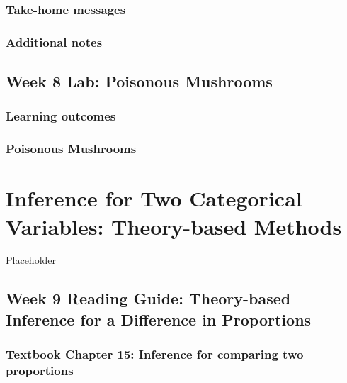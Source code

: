 \documentclass[
]{report}
\begin{document}
\hypertarget{take-home-messages-14}{%
\subsection{Take-home messages}\label{take-home-messages-14}}

\hypertarget{additional-notes-13}{%
\subsection{Additional notes}\label{additional-notes-13}}

\hypertarget{week-8-lab-poisonous-mushrooms}{%
\section{Week 8 Lab: Poisonous Mushrooms}\label{week-8-lab-poisonous-mushrooms}}

\hypertarget{learning-outcomes-16}{%
\subsection{Learning outcomes}\label{learning-outcomes-16}}

\hypertarget{poisonous-mushrooms}{%
\subsection{Poisonous Mushrooms}\label{poisonous-mushrooms}}

\hypertarget{inference-for-two-categorical-variables-theory-based-methods}{%
\chapter{Inference for Two Categorical Variables: Theory-based Methods}\label{inference-for-two-categorical-variables-theory-based-methods}}

Placeholder

\hypertarget{week-9-reading-guide-theory-based-inference-for-a-difference-in-proportions}{%
\section{Week 9 Reading Guide: Theory-based Inference for a Difference in Proportions}\label{week-9-reading-guide-theory-based-inference-for-a-difference-in-proportions}}

\hypertarget{textbook-chapter-15-inference-for-comparing-two-proportions-1}{%
\subsection*{Textbook Chapter 15: Inference for comparing two proportions}\label{textbook-chapter-15-inference-for-comparing-two-proportions-1}}
\end{document}
